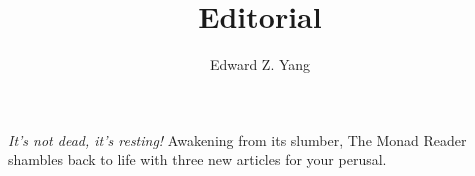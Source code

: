 \documentclass{tmr}
\title{Editorial}
\author{Edward Z. Yang\email{ezyang@mit.edu}}
\begin{document}
\textit{It's not dead, it's resting!}  Awakening from its slumber,
The Monad Reader shambles back to life with three new articles for
your perusal.
\end{document}
